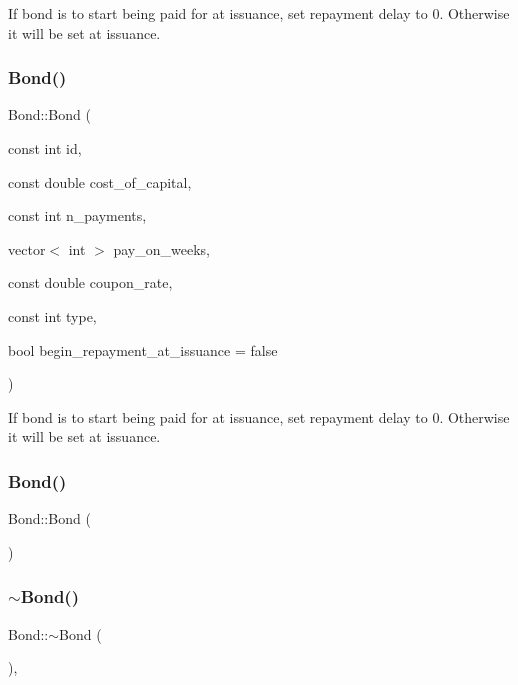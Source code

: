 If bond is to start being paid for at issuance, set repayment delay to 0. Otherwise it will be set at issuance. \mbox{\label{classBond_a8758b7ef325a779eeee87eb91947ce58}} 
\subsubsection{\texorpdfstring{Bond()}{Bond()}\hspace{0.1cm}{\footnotesize\ttfamily [2/4]}}
{\footnotesize\ttfamily Bond\+::\+Bond (\begin{DoxyParamCaption}\item[{const int}]{id,  }\item[{const double}]{cost\+\_\+of\+\_\+capital,  }\item[{const int}]{n\+\_\+payments,  }\item[{vector$<$ int $>$}]{pay\+\_\+on\+\_\+weeks,  }\item[{const double}]{coupon\+\_\+rate,  }\item[{const int}]{type,  }\item[{bool}]{begin\+\_\+repayment\+\_\+at\+\_\+issuance = {\ttfamily false} }\end{DoxyParamCaption})}

If bond is to start being paid for at issuance, set repayment delay to 0. Otherwise it will be set at issuance. \mbox{\label{classBond_a5b809c10637a30a2b24ed01609d68711}} 
\subsubsection{\texorpdfstring{Bond()}{Bond()}\hspace{0.1cm}{\footnotesize\ttfamily [3/4]}}
{\footnotesize\ttfamily Bond\+::\+Bond (\begin{DoxyParamCaption}{ }\end{DoxyParamCaption})}

\mbox{\label{classBond_a6072f41bd412cb66b4fb13833a14d0ec}} 
\subsubsection{\texorpdfstring{$\sim$\+Bond()}{~Bond()}}
{\footnotesize\ttfamily Bond\+::$\sim$\+Bond (\begin{DoxyParamCaption}{ }\end{DoxyParamCaption})\hspace{0.3cm}{\ttfamily [virtual]}, {\ttfamily [default]}}

